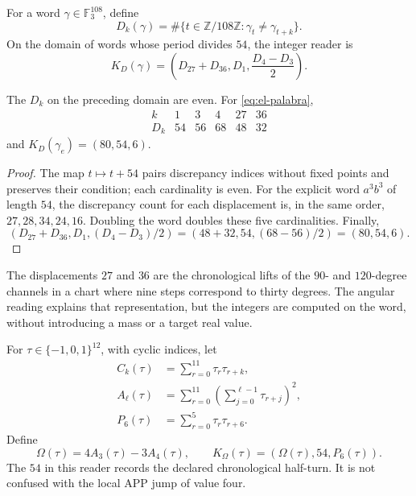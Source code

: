 \begin{definition}
For a word \(\gamma\in\mathbb F_3^{108}\), define
\[
 D_k(\gamma)=\#\{t\in\mathbb Z/108\mathbb Z:
                   \gamma_t\ne\gamma_{t+k}\}.
\]
On the domain of words whose period divides \(54\), the integer
reader is
\begin{equation}
 K_D(\gamma)=\left(D_{27}+D_{36},D_1,\frac{D_4-D_3}{2}\right).
 \label{eq:el-kd}
\end{equation}
\end{definition}

\begin{lemma}
The \(D_k\) on the preceding domain are even. For
\eqref{eq:el-palabra},
\[
 \begin{array}{c|rrrrr}
 k&1&3&4&27&36\\\hline
 D_k&54&56&68&48&32
 \end{array}
\]
and \(K_D(\gamma_e)=(80,54,6)\).
\end{lemma}
\begin{proof}
The map \(t\mapsto t+54\) pairs discrepancy indices without fixed
points and preserves their condition; each cardinality is even. For the
explicit word \(a^3b^3\) of length \(54\), the discrepancy
count for each displacement is, in the same order,
\(27,28,34,24,16\). Doubling the word doubles these five cardinalities.
Finally,
\[
 (D_{27}+D_{36},D_1,(D_4-D_3)/2)
 =(48+32,54,(68-56)/2)=(80,54,6).
\]
\end{proof}

The displacements \(27\) and \(36\) are the chronological
lifts of the \(90\)- and \(120\)-degree channels in a chart
where nine steps correspond to thirty degrees. The angular reading
explains that representation, but the integers are computed on the
word, without introducing a mass or a target real value.

\begin{definition}
For \(\tau\in\{-1,0,1\}^{12}\), with cyclic indices, let
\begin{align*}
 C_k(\tau)&=\sum_{r=0}^{11}\tau_r\tau_{r+k},\\
 A_\ell(\tau)&=\sum_{r=0}^{11}
           \left(\sum_{j=0}^{\ell-1}\tau_{r+j}\right)^2,\\
 P_6(\tau)&=\sum_{r=0}^{5}\tau_r\tau_{r+6}.
\end{align*}
Define
\begin{equation}
 \Omega(\tau)=4A_3(\tau)-3A_4(\tau),\qquad
 K_\Omega(\tau)=(\Omega(\tau),54,P_6(\tau)).
 \label{eq:el-komega}
\end{equation}
The \(54\) in this reader records the declared chronological half-turn.
It is not confused with the local APP jump of value four.
\end{definition}

